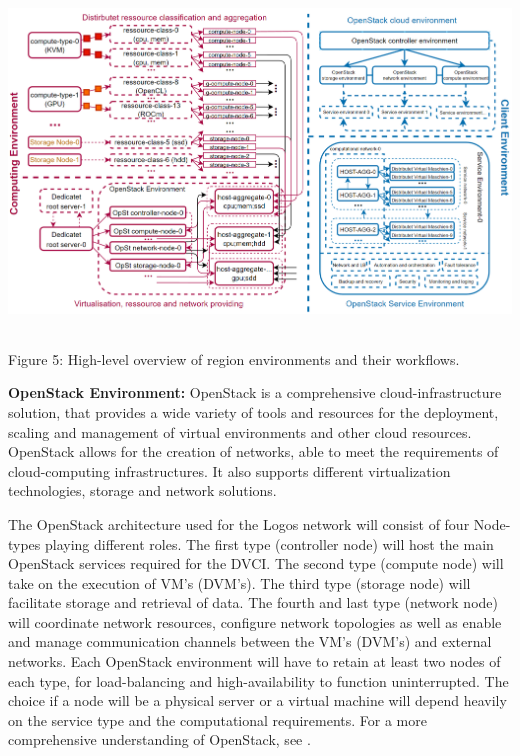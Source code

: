 \documentclass[]{article}
\begin{document}
\begin{center}
	\includegraphics[height=9cm]{region-environments}
\end{center}
\begin{center}
	Figure 5: High-level overview of region environments and their workflows.
\end{center}

\textbf{OpenStack Environment:}
OpenStack is a comprehensive cloud-infrastructure solution, that provides a wide variety of tools and resources for the deployment, scaling and management of virtual environments and other cloud resources. 
OpenStack allows for the creation of networks, able to meet the requirements of cloud-computing infrastructures. 
It also supports different virtualization technologies, storage and network solutions.

The OpenStack architecture used for the Logos network will consist of four Node-types playing different roles.
The first type (controller node) will host the main OpenStack services required for the DVCI.
The second type (compute node) will take on the execution of VM's (DVM's).
The third type (storage node) will facilitate storage and retrieval of data.
The fourth and last type (network node) will coordinate network resources, configure network topologies as well as enable and manage communication channels between the VM's (DVM's) and external networks. 
Each OpenStack environment will have to retain at least two nodes of each type, for load-balancing and high-availability to function uninterrupted.
The choice if a node will be a physical server or a virtual machine will depend heavily on the service type and the computational requirements.
For a more comprehensive understanding of OpenStack, see \cite{OpenStackDoc-design}.
\end{document}
